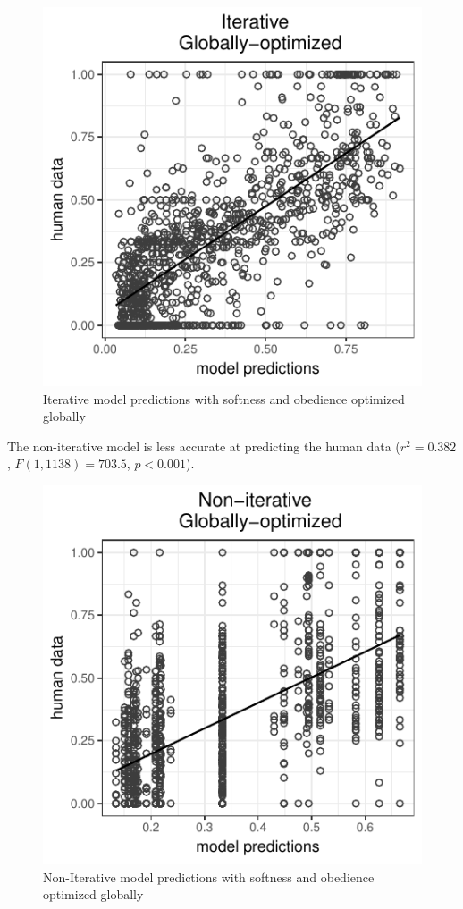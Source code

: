 \documentclass[10pt,a4paper]{article}
\begin{document}
 \begin{figure}
 	\centering
 	\includegraphics[width=.8\linewidth]{images/m4.pdf}
 	\caption{Iterative model predictions with softness and obedience optimized globally}	
 	\label{iterative}
 \end{figure}

The non-iterative model is less accurate at predicting the human data  ($r^2=0.382$, $F(1,1138) = 703.5$, $p<0.001$).

 \begin{figure}
	\centering
	\includegraphics[width=.8\linewidth]{images/m8.pdf}
	\caption{Non-Iterative model predictions with softness and obedience optimized globally}	
	\label{non-iterative}
\end{figure}
 
\end{document}
